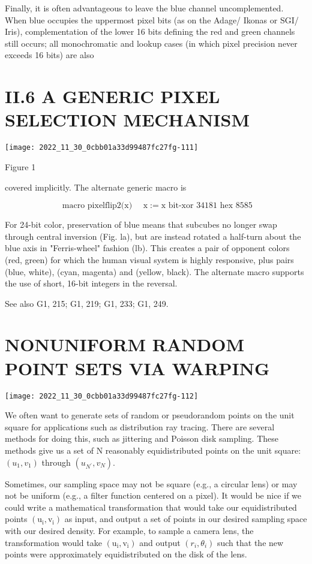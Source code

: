\begin{CJK}{UTF8}{gbsn}
Finally, it is often advantageous to leave the blue channel uncomplemented. When blue occupies the uppermost pixel bits (as on the Adage/ Ikonas or SGI/ Iris), complementation of the lower 16 bits defining the red and green channels still occurs; all monochromatic and lookup cases (in which pixel precision never exceeds 16 bits) are also

\section{II.6 A GENERIC PIXEL SELECTION MECHANISM}
\begin{center}
\texttt{[image: 2022\_11\_30\_0cbb01a33d99487fc27fg-111]}
\end{center}

Figure 1

covered implicitly. The alternate generic macro is

$$
\text { macro pixelflip2(x) } \quad \mathrm{x}:=\mathrm{x} \text { bit-xor } 34181 \text { hex } 8585
$$

For 24-bit color, preservation of blue means that subcubes no longer swap through central inversion (Fig. la), but are instead rotated a half-turn about the blue axis in "Ferris-wheel" fashion (lb). This creates a pair of opponent colors (red, green) for which the human visual system is highly responsive, plus pairs (blue, white), (cyan, magenta) and (yellow, black). The alternate macro supports the use of short, 16-bit integers in the reversal.

See also G1, 215; G1, 219; G1, 233; G1, 249.

\section{NONUNIFORM RANDOM POINT SETS VIA WARPING}
\begin{center}
\texttt{[image: 2022\_11\_30\_0cbb01a33d99487fc27fg-112]}
\end{center}

We often want to generate sets of random or pseudorandom points on the unit square for applications such as distribution ray tracing. There are several methods for doing this, such as jittering and Poisson disk sampling. These methods give us a set of $\mathrm{N}$ reasonably equidistributed points on the unit square: $\left(u_{1}, v_{1}\right)$ through $\left(u_{N^{\prime}}, v_{N}\right)$.

Sometimes, our sampling space may not be square (e.g., a circular lens) or may not be uniform (e.g., a filter function centered on a pixel). It would be nice if we could write a mathematical transformation that would take our equidistributed points $\left(\mathrm{u}_{\mathrm{i}}, \mathrm{v}_{\mathrm{i}}\right)$ as input, and output a set of points in our desired sampling space with our desired density. For example, to sample a camera lens, the transformation would take $\left(\mathrm{u}_{\mathrm{i}}, \mathrm{v}_{\mathrm{i}}\right)$ and output $\left(r_{i}, \theta_{i}\right)$ such that the new points were approximately equidistributed on the disk of the lens.


\end{CJK}
